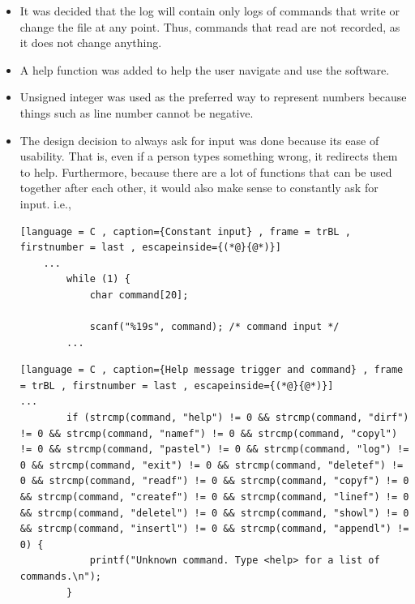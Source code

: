 \documentclass[a4paper]{article}
\theoremstyle{plain}
\theoremstyle{definition}
\theoremstyle{remark}
\begin{document}
\begin{itemize}
\begin{lstlisting}[language = C , caption={Location Error Check} , frame = trBL , firstnumber = last , escapeinside={(*@}{@*)}]
			if (tempDirectory) {
				fixedDir = 1; /* Value used to break loop */
			} else {
				fixedDir = 0;  /* Value used to repeat loop */
			}
			if (tempDirectoryAndFile) {
				printf("The path %s has been selected successfully.\n", directoryAndFile); /* Check if path depending on current inputs WITHOUT file input exists */
				fixed = 0; /* Value used to repeat loop */
				closedir(tempDirectoryAndFile);
			} else if (ENOENT == errno) {
				printf("The path %s does not exist.\n", directoryAndFile); /* Check if error because it does not exist */
				fixed = 0; /* Value used to repeat loop */
			} else if (ENOTDIR == errno && tempDirectory) {
				printf("The path %s has been selected successfully. \n", directoryAndFile); /* Check if path depending on current inputs exists and would be a valid directory without the existence of file */
				fixed = 1; /* Value used to break loop */
			} else {
				printf("The path %s could not be opened.\n", directoryAndFile); /* Other errors */
				fixed = 0; /* Value used to repeat loop */
			}
	}
	...
		\end{lstlisting}
	\item It was decided that the log will contain only logs of commands that write or change the file at any point. Thus, commands that read are not recorded, as it does not change anything.
	\item A help function was added to help the user navigate and use the software.
	\item Unsigned integer was used as the preferred way to represent numbers because things such as line number cannot be negative.
	\item The design decision to always ask for input was done because its ease of usability. That is, even if a person types something wrong, it redirects them to help. Furthermore, because there are a lot of functions that can be used together after each other, it would also make sense to constantly ask for input.
	i.e.,
	\begin{lstlisting}[language = C , caption={Constant input} , frame = trBL , firstnumber = last , escapeinside={(*@}{@*)}]
	...
		while (1) {
			char command[20];	

			scanf("%19s", command); /* command input */
		...
	\end{lstlisting}
	\begin{lstlisting}[language = C , caption={Help message trigger and command} , frame = trBL , firstnumber = last , escapeinside={(*@}{@*)}]
...
		if (strcmp(command, "help") != 0 && strcmp(command, "dirf") != 0 && strcmp(command, "namef") != 0 && strcmp(command, "copyl") != 0 && strcmp(command, "pastel") != 0 && strcmp(command, "log") != 0 && strcmp(command, "exit") != 0 && strcmp(command, "deletef") != 0 && strcmp(command, "readf") != 0 && strcmp(command, "copyf") != 0 && strcmp(command, "createf") != 0 && strcmp(command, "linef") != 0 && strcmp(command, "deletel") != 0 && strcmp(command, "showl") != 0 && strcmp(command, "insertl") != 0 && strcmp(command, "appendl") != 0) {
			printf("Unknown command. Type <help> for a list of commands.\n");
		}


\end{lstlisting}
\end{itemize}
\end{document}
